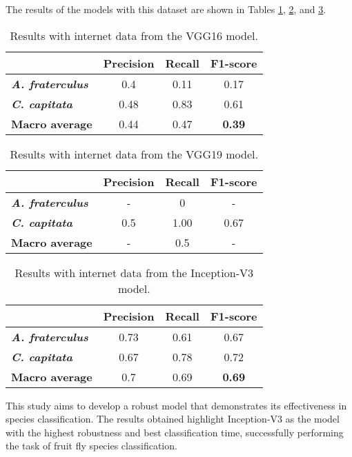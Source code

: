 The results of the models with this dataset are shown in Tables \ref{tab:ivgg16}, \ref{tab:ivgg19}, and \ref{tab:iv3}.
\begin{table}[htbp]  
	\centering  
	\caption{Results with internet data from the VGG16 model.}  
	\label{tab:ivgg16}  
	\begin{tabular}{|l|c|c|c|}  
		\hline  
		& \textbf{Precision} & \textbf{Recall} & \textbf{F1-score} \\  
		\hline  
		\textbf{\textit{A. fraterculus}} & 0.4 & 0.11 & 0.17 \\  
		\hline  
		\textbf{\textit{C. capitata}} & 0.48 & 0.83 & 0.61 \\  
		\hline  
		\textbf{Macro average} & 0.44 & 0.47 & \textbf{0.39} \\  
		\hline  
	\end{tabular}  
\end{table}
\begin{table}[htbp]  
	\centering  
	\caption{Results with internet data from the VGG19 model.}  
	\label{tab:ivgg19}  
	\begin{tabular}{|l|c|c|c|}  
		\hline  
		& \textbf{Precision} & \textbf{Recall} & \textbf{F1-score} \\  
		\hline  
		\textbf{\textit{A. fraterculus}} & - & 0 & - \\  
		\hline  
		\textbf{\textit{C. capitata}} & 0.5 & 1.00 & 0.67 \\  
		\hline  
		\textbf{Macro average} & - & 0.5 & - \\  
		\hline  
	\end{tabular}  
\end{table}
\begin{table}[htbp]  
	\centering  
	\caption{Results with internet data from the Inception-V3 model.}  
	\label{tab:iv3}  
	\begin{tabular}{|l|c|c|c|}  
		\hline  
		& \textbf{Precision} & \textbf{Recall} & \textbf{F1-score} \\  
		\hline  
		\textbf{\textit{A. fraterculus}} & 0.73 & 0.61 & 0.67 \\  
		\hline  
		\textbf{\textit{C. capitata}} & 0.67 & 0.78 & 0.72 \\  
		\hline  
		\textbf{Macro average} & 0.7 & 0.69 & \textbf{0.69} \\  
		\hline  
	\end{tabular}  
\end{table}

This study aims to develop a robust model that demonstrates its effectiveness in species classification. The results obtained highlight Inception-V3 as the model with the highest robustness and best classification time, successfully performing the task of fruit fly species classification.